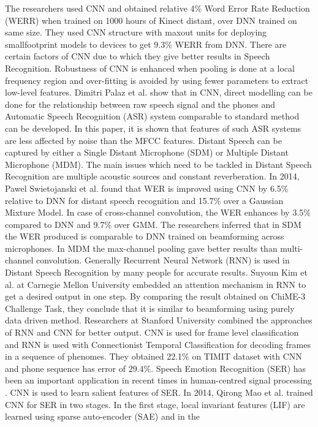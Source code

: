 \documentclass[12pt]{article}
\begin{document}
The researchers used CNN and obtained relative 4\% Word
Error Rate Reduction (WERR) when trained on 1000 hours
of Kinect distant, over DNN trained on same size. They
used CNN structure with maxout units for deploying smallfootprint models to devices to get 9.3\% WERR from DNN.
There are certain factors of CNN due to which they give
better results in Speech Recognition. Robustness of CNN is
enhanced when pooling is done at a local frequency region
and over-fitting is avoided by using fewer parameters to
extract low-level features. Dimitri Palaz et al. show
that in CNN, direct modelling can be done for the
relationship between raw speech signal and the phones and
Automatic Speech Recognition (ASR) system comparable
to standard method can be developed. In this paper, it is
shown that features of such ASR systems are less affected
by noise than the MFCC features.
Distant Speech can be captured by either a Single
Distant Microphone (SDM) or Multiple Distant
Microphone (MDM). The main issues which need to be
tackled in Distant Speech Recognition are multiple acoustic
sources and constant reverberation. In 2014, Pawel
Swietojanski et al.  found that WER is improved using
CNN by 6.5\% relative to DNN for distant speech
recognition and 15.7\% over a Gaussian Mixture Model. In
case of cross-channel convolution, the WER enhances by
3.5\% compared to DNN and 9.7\% over GMM. The
researchers inferred that in SDM the WER produced is
comparable to DNN trained on beamforming across microphones. In MDM the max-channel pooling gave better
results than multi-channel convolution. Generally Recurrent
Neural Network (RNN) is used in Distant Speech
Recognition by many people for accurate results. Suyoun
Kim et al. at Carnegie Mellon University embedded an
attention mechanism in RNN to get
a desired output in
one step. By comparing the result obtained on ChiME-3
Challenge Task, they conclude that it is similar to
beamforming using purely data driven method. Researchers
at Stanford University combined the approaches of RNN
and CNN for better output. CNN is used for frame level
classification and RNN is used with Connectionist
Temporal Classification for decoding frames in a sequence
of phenomes. They obtained 22.1\% on TIMIT dataset
with CNN and phone sequence has error of 29.4\%.
Speech Emotion Recognition (SER) has been an
important application in recent times in human-centred
signal processing . CNN is used to learn salient features
of SER. In 2014, Qirong Mao et al. trained CNN for SER in
two stages. In the first stage, local invariant features (LIF)
are learned using sparse auto-encoder (SAE) and in the
\end{document}
